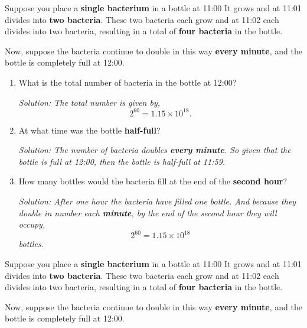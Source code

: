 \documentclass[12pt]{article}
\begin{document}
Suppose you place a {\bf single bacterium} in a bottle at 11:00  It grows and at 11:01 divides into {\bf two bacteria}.  These two bacteria each grow and at 11:02 each divides into two bacteria, resulting in a total of {\bf four bacteria} in the bottle.

Now, suppose the bacteria continue to double in this way {\bf every minute}, and the bottle is completely full at 12:00.

\begin{enumerate}
\item What is the total number of bacteria in the bottle at 12:00?

{\it Solution:
The total number is given by, $$2^{60} = 1.15\times 10^{18}.$$

}

\item At what time was the bottle {\bf half-full}?

{\it Solution:
The number of bacteria doubles {\bf every minute}.  So given that the bottle is full at 12:00, then the bottle is half-full at 11:59.

}

\item How many bottles would the bacteria fill at the end of the {\bf second hour}?

{\it Solution:
After one hour the bacteria have filled one bottle.  And because they double in number each {\bf minute}, by the end of the second hour they will occupy, $$2^{60} = 1.15\times 10^{18}$$
bottles.

}

\end{enumerate}

Suppose you place a {\bf single bacterium} in a bottle at 11:00  It grows and at 11:01 divides into {\bf two bacteria}.  These two bacteria each grow and at 11:02 each divides into two bacteria, resulting in a total of {\bf four bacteria} in the bottle.

Now, suppose the bacteria continue to double in this way {\bf every minute}, and the bottle is completely full at 12:00.
\end{document}
